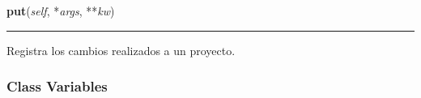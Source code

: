     \vspace{0.5ex}

\hspace{.8\funcindent}\begin{boxedminipage}{\funcwidth}

    \raggedright \textbf{put}(\textit{self}, *\textit{args}, **\textit{kw})

    \vspace{-1.5ex}

    \rule{\textwidth}{0.5\fboxrule}
\setlength{\parskip}{2ex}
    Registra los cambios realizados a un proyecto.

\setlength{\parskip}{1ex}
    \end{boxedminipage}



  \subsubsection{Class Variables}

